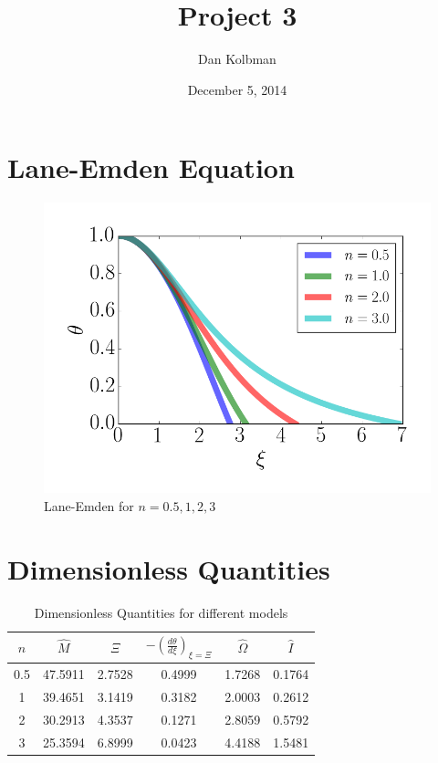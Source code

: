 \documentclass[12pt]{article}
\title{Project 3}
\author{Dan Kolbman}
\date{December 5, 2014}
\begin{document}
  
  \maketitle

  \section{Lane-Emden Equation}
  \begin{figure}[h!]
    \centering
    \includegraphics[width=1.0\textwidth]{lane-emden.png}
    \caption{Lane-Emden for $n=0.5,1,2,3$}
  \end{figure}
  \clearpage
  \section{Dimensionless Quantities}
  \begin{table}[h!]
    \begin{center}
      \begin{tabular}{ | c | c | c | c | c | c | }
        \hline
        $n$ & $\hat{M}$  & $\Xi$  & $-(\frac{d\theta}{d\xi})_{\xi=\Xi}$ & $ \hat{\Omega} $ & $\hat{I}$ \\
        \hline
        0.5 & 47.5911 & 2.7528 & 0.4999 & 1.7268 & 0.1764 \\
        \hline
        1   & 39.4651 & 3.1419 & 0.3182 & 2.0003 & 0.2612 \\
        \hline
        2   & 30.2913 & 4.3537 & 0.1271 & 2.8059 & 0.5792 \\
        \hline
        3   & 25.3594 & 6.8999 & 0.0423 & 4.4188 & 1.5481 \\
        \hline
      \end{tabular}
      \caption{Dimensionless Quantities for different models}
    \end{center}
  \end{table}
\end{document}
